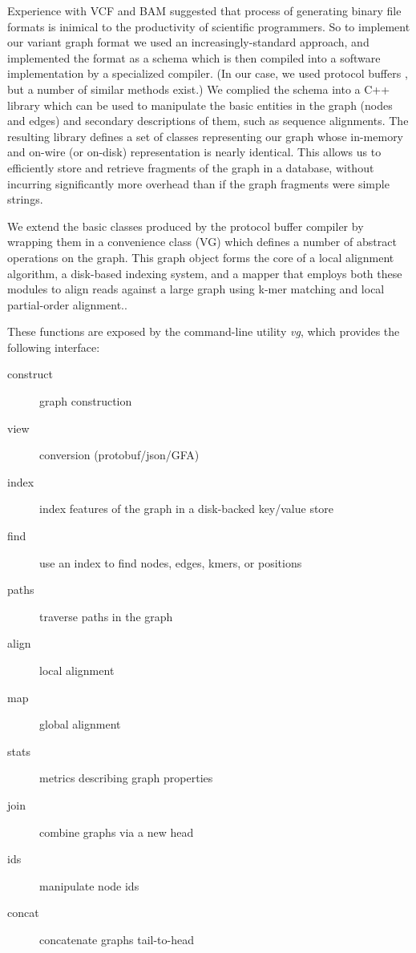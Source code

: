 \documentclass{article}
\begin{document}
Experience with VCF \cite{danecek2011} and BAM \cite{li2009sambam} suggested that process of generating binary file formats is inimical to the productivity of scientific programmers.
So to implement our variant graph format we used an increasingly-standard approach, and implemented the format as a schema which is then compiled into a software implementation by a specialized compiler. (In our case, we used protocol buffers \cite{protobuf}, but a number of similar methods exist.)
We complied the schema into a C++ library which can be used to manipulate the basic entities in the graph (nodes and edges) and secondary descriptions of them, such as sequence alignments.
The resulting library defines a set of classes representing our graph whose in-memory and on-wire (or on-disk) representation is nearly identical.
This allows us to efficiently store and retrieve fragments of the graph in a database, without incurring significantly more overhead than if the graph fragments were simple strings.

We extend the basic classes produced by the protocol buffer compiler by wrapping them in a convenience class (VG) which defines a number of abstract operations on the graph. This graph object forms the core of a local alignment algorithm, a disk-based indexing system, and a mapper that employs both these modules to align reads against a large graph using k-mer matching and local partial-order alignment..

These functions are exposed by the command-line utility \emph{vg}, which provides the following interface:

\begin{description}
  \item[ construct    ] graph construction
  \item[ view         ] conversion (protobuf/json/GFA)
  \item[ index        ] index features of the graph in a disk-backed key/value store
  \item[ find         ] use an index to find nodes, edges, kmers, or positions
  \item[ paths        ] traverse paths in the graph
  \item[ align        ] local alignment
  \item[ map          ] global alignment
  \item[ stats        ] metrics describing graph properties
  \item[ join         ] combine graphs via a new head
  \item[ ids          ] manipulate node ids
  \item[ concat       ] concatenate graphs tail-to-head
\end{description}
\end{document}
